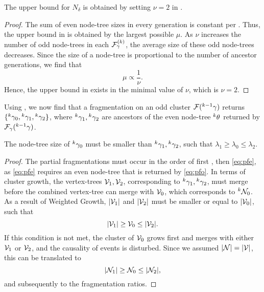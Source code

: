 \begin{theorem}\label{the:fragnumber}
  The upper bound for $N_\delta$ is obtained by setting $\nu=2$ in . 
\end{theorem}
\begin{proof}
  The sum of even node-tree sizes in every generation is constant per . Thus, the upper bound in  is obtained by the largest possible $\mu$. As $\nu$ increases the number of odd node-trees in each $\mathcal{F}^{(k)}_\gamma$, the average size of these odd node-trees decreases. Since the size of a node-tree is proportional to the number of ancestor generations, we find that 
  \begin{equation*}
    \mu \propto \frac{1}{\nu}. 
  \end{equation*}
  Hence, the upper bound in  exists in the minimal value of $\nu$, which is $\nu = 2$.
\end{proof}

Using , we now find that a fragmentation on an odd cluster $\mathcal{F}({}^{k-1}\gamma)$ returns $\{{}^{k}\gamma_0, {}^{k}\gamma_1, {}^{k}\gamma_2\}$, where ${}^{k}\gamma_1, {}^{k}\gamma_2$ are ancestors of the even node-tree ${}^{k}\theta$ returned by $\mathcal{F}_\gamma({}^{k-1}\gamma)$. 

\begin{lemma}\label{lem:chrono}
  The node-tree size of ${}^{k}\gamma_0$ must be smaller than ${}^{k}\gamma_1, {}^{k}\gamma_2$, such that $\lambda_1 \geq \lambda_0 \leq \lambda_2$. 
\end{lemma}
\begin{proof}
  The partial fragmentations must occur in the order of first , then \eqref{eq:pfe}, as \eqref{eq:pfe} requires an even node-tree that is returned by \eqref{eq:pfo}. In terms of cluster growth, the vertex-trees $\mathcal{V}_1, \mathcal{V}_2$, corresponding to ${}^{k}\gamma_1, {}^{k}\gamma_2$, must merge before the combined vertex-tree can merge with $\mathcal{V}_0$, which corresponds to ${}^{k}\mathcal{N}_0$. As a result of Weighted Growth, $\lvert\mathcal{V}_1\rvert$ and $\lvert\mathcal{V}_2\rvert$ must be smaller or equal to $\lvert\mathcal{V}_0\rvert$, such that 
  \begin{equation*}
    \lvert\mathcal{V}_1\rvert\geq \mathcal{V}_0 \leq\lvert\mathcal{V}_2\rvert.
  \end{equation*}
  If this condition is not met, the cluster of $\mathcal{V}_0$ grows first and merges with either $\mathcal{V}_1$ or $\mathcal{V}_2$, and the causality of events is disturbed. Since we assumed $\lvert\mathcal{N}\rvert=\lvert\mathcal{V}\rvert$, this can be translated to 
  \begin{equation*}
    \lvert\mathcal{N}_1\rvert\geq \mathcal{N}_0 \leq\lvert\mathcal{N}_2\rvert,
  \end{equation*}
  and subsequently to the fragmentation ratios.
\end{proof}

